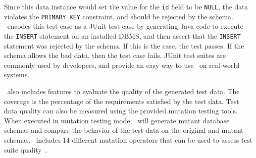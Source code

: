 

Since this data instance would set the value for the \texttt{id} field to be \texttt{NULL}, the data violates the
\texttt{PRIMARY KEY} constraint, and should be rejected by the schema.  \sa~encodes this test case as a JUnit test case
by generating Java code to execute the \texttt{INSERT} statement on an installed DBMS, and then assert that the
\texttt{INSERT} statement was rejected by the schema. If this is the case, the test passes.  If the schema allows the
bad data, then the test case fails. JUnit test suites are commonly used by developers, and provide an easy way to use
\sa~on real-world systems.

\sa~also includes features to evaluate the quality of the generated test data. The coverage is the percentage of the
requirements satisfied by the test data.  Test data quality can also be measured using the provided mutation testing
tools. When executed in mutation testing mode, \sa~will generate mutant database schemas and compare the behavior of the
test data on the original and mutant schemas. \sa~includes 14 different mutation operators that can be used to assess
test suite quality~\cite{wright2015mutation}.



